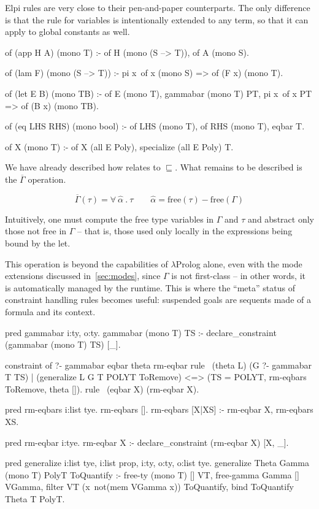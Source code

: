 \documentclass[a4paper, 11pt]{book}
\begin{document}
Elpi rules are very close to their pen-and-paper counterparts. The only
difference is that the rule for variables is intentionally extended to any
term, so that it can apply to global constants as well.

\begin{elpicode}
of (app H A) (mono T) :-
  of H (mono (S --> T)),
  of A (mono S).

of (lam F) (mono (S --> T)) :-
  pi x\ of x (mono S) => of (F x) (mono T).

of (let E B) (mono TB) :-
  of E (mono T),
  gammabar (mono T) PT,
  pi x\ of x PT => of (B x) (mono TB).

of (eq LHS RHS) (mono bool) :-
  of LHS (mono T),
  of RHS (mono T),
  eqbar T.

of X (mono T) :- of X (all E Poly), specialize (all E Poly) T.
\end{elpicode}

We have already described how  relates to $\sqsubseteq$.
What remains to be described is the $\overline{\Gamma}$ operation.

$$
\overline{\Gamma}(\tau) = \forall\ \hat{\alpha}\ .\ \tau \quad\quad \hat{\alpha} = \textrm{free}(\tau) - \textrm{free}(\Gamma)
$$

Intuitively, one must compute the free type variables in $\Gamma$ and $\tau$
and abstract only those not free in $\Gamma$ -- that is, those used only locally
in the expressions being bound by the let.

This operation is beyond the capabilities of $\lambda$Prolog alone, even with
the mode extensions discussed in~\cref{sec:modes}, since $\Gamma$ is not
first-class -- in other words, it is automatically managed by the runtime. This
is where the ``meta'' status of constraint handling rules becomes useful:
suspended goals are sequents made of a formula and its context.

\begin{elpicode}
pred gammabar i:ty, o:ty.
gammabar (mono T) TS :- declare_constraint (gammabar (mono T) TS) [_].

constraint of ?- gammabar eqbar theta rm-eqbar {
  rule  \ (theta L)
          (G ?- gammabar T TS)              %
        | (generalize L G T POLYT ToRemove) %
      <=> (TS = POLYT, rm-eqbars ToRemove, theta []). %
  rule \ (eqbar X) (rm-eqbar X).
}

pred rm-eqbars i:list tye.
rm-eqbars [].
rm-eqbars [X|XS] :- rm-eqbar X, rm-eqbars XS.

pred rm-eqbar i:tye.
rm-eqbar X :- declare_constraint (rm-eqbar X) [X, _].

pred generalize i:list tye, i:list prop, i:ty, o:ty, o:list tye.
generalize Theta Gamma (mono T) PolyT ToQuantify :-
  free-ty (mono T) [] VT,
  free-gamma Gamma [] VGamma,
  filter VT (x\ not(mem VGamma x)) ToQuantify,
  bind ToQuantify Theta T PolyT.
\end{elpicode}
\end{document}
